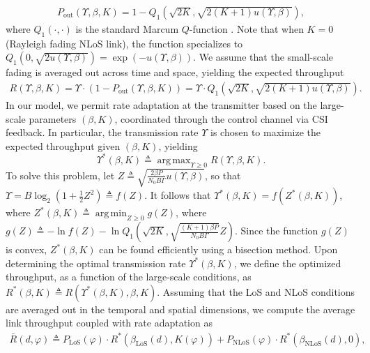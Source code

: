 \documentclass[12pt, draftcls, onecolumn]{IEEEtran}
\theoremstyle{plain}
\theoremstyle{definition}
\theoremstyle{remark}
\DeclareMathOperator*{\argmax}{arg\,max}
\DeclareMathOperator*{\argmin}{arg\,min}
\begin{document}
\begin{align}
	P_{\mathrm{out}}(\Upsilon,\beta,K)=1-Q_{1}\left(\sqrt{2K},\sqrt{2(K+1)u(\Upsilon,\beta)}\right),
\end{align}
where $Q_{1}(\cdot,\cdot)$ is the standard Marcum $Q$-function \cite{Rician}. Note that when $K{=}0$ (Rayleigh fading NLoS link), the function specializes to $Q_{1}\left(0,\sqrt{2u(\Upsilon,\beta)}\right){=}\exp(-u(\Upsilon,\beta))$. We assume that the small-scale fading is averaged out across time and space, yielding the expected throughput
\begin{align}
	R(\Upsilon,\beta,K)=\Upsilon\cdot\left(1-P_{\mathrm{out}}(\Upsilon,\beta,K)\right)=\Upsilon\cdot Q_{1}\left(\sqrt{2K},\sqrt{2(K+1)u(\Upsilon,\beta)}\right).
\end{align}
In our model, we permit rate adaptation at the transmitter based on the large-scale parameters $(\beta,K)$, coordinated through the control channel via CSI feedback. In particular, the transmission rate $\Upsilon$ is chosen to maximize the expected throughput given $(\beta,K)$, yielding $$\Upsilon^{*}(\beta,K) \triangleq \argmax_{\Upsilon \geq 0}R(\Upsilon,\beta,K).$$
To solve this problem, let $Z{\triangleq}\sqrt{\frac{2{\beta}P}{N_{0}B\Gamma}u(\Upsilon,\beta)}$, so that $\Upsilon{=}B\log_{2}\left(1{+}\frac{1}{2}Z^{2}\right){\triangleq}f(Z)$. It follows that $\Upsilon^{*}(\beta,K){=}f(Z^{*}(\beta,K))$, where $Z^{*}(\beta,K)\triangleq\argmin_{Z{\geq}0}g(Z)$, where $g(Z) \triangleq -\ln f(Z) - \ln Q_{1}\left(\sqrt{2K},\sqrt{\frac{(K{+}1)\beta P}{N_{0}B\Gamma}}Z\right)$. Since the function $g(Z)$ is convex, $Z^{*}(\beta,K)$ can be found efficiently using a bisection method. Upon determining the optimal transmission rate $\Upsilon^{*}(\beta,K)$, we define the optimized throughput, as a function of the large-scale conditions, as $R^{*}(\beta,K) \triangleq R(\Upsilon^{*}(\beta,K),\beta,K)$. Assuming that the LoS and NLoS conditions are averaged out in the temporal and spatial dimensions, we compute the average link throughput coupled with rate adaptation as
\begin{align}\label{TBar}
	\bar{R}(d,\varphi)\triangleq P_{\mathrm{LoS}}(\varphi)\cdot R^{*}(\beta_{\mathrm{LoS}}(d),K(\varphi))+P_{\mathrm{NLoS}}(\varphi)\cdot R^{*}(\beta_{\mathrm{NLoS}}(d),0),
\end{align}
\end{document}
